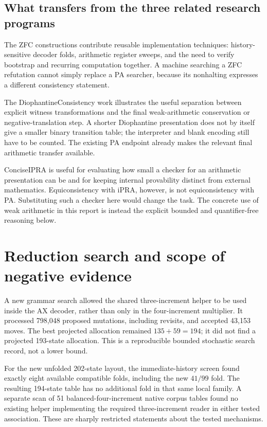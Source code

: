 \documentclass[10pt,letterpaper]{article}
\newcommand{\file}[1]{\path{#1}}
\begin{document}
\subsection{What transfers from the three related research programs}

The ZFC constructions contribute reusable implementation techniques:
history-sensitive decoder folds, arithmetic register sweeps, and the
need to verify bootstrap and recurring computation together. A machine
searching a ZFC refutation cannot simply replace a PA searcher, because
its nonhalting expresses a different consistency statement.

The DiophantineConsistency work illustrates the useful separation
between explicit witness transformations and the final weak-arithmetic
conservation or negative-translation step. A shorter Diophantine
presentation does not by itself give a smaller binary transition table;
the interpreter and blank encoding still have to be counted. The
existing PA \file{isigma1-transfer} endpoint already makes the relevant
final arithmetic transfer available.

ConciseIPRA is useful for evaluating how small a checker for an
arithmetic presentation can be and for keeping internal provability
distinct from external mathematics. Equiconsistency with iPRA, however,
is not equiconsistency with PA. Substituting such a checker here would
change the task. The concrete use of weak arithmetic in this report is
instead the explicit bounded and quantifier-free reasoning below.

\section{Reduction search and scope of negative evidence}
\label{sec:search}

A new grammar search allowed the shared three-increment helper to be
used inside the AX decoder, rather than only in the four-increment
multiplier. It processed 798,048 proposed mutations, including revisits,
and accepted 43,153 moves. The best projected allocation remained
$135+59=194$; it did not find a projected 193-state allocation. This
is a reproducible bounded stochastic search record, not a lower bound.

For the new unfolded 202-state layout, the immediate-history screen
found exactly eight available compatible folds, including the new
$41/99$ fold. The resulting 194-state table has no additional fold in
that same local family. A separate scan of 51 balanced-four-increment
native corpus tables found no existing helper implementing the required
three-increment reader in either tested association. These are sharply
restricted statements about the tested mechanisms.
\end{document}
